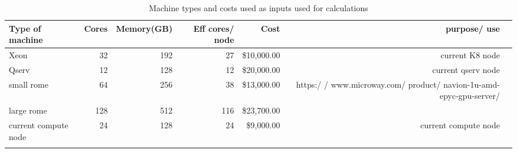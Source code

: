 \tiny \begin{longtable} { |p{}  |r  |r  |r  |r  |r  |r |} 
\caption{Machine types and costs used as inputs used for calculations \label{tab:Machines}}\\ 
\hline 
\textbf{Type of machine }&\textbf{Cores}&\textbf{Memory(GB)}&\textbf{Eff cores/ node}&\textbf{Cost}&\textbf{purpose/ use } \\ \hline
{Xeon }&{32}&{192}&{27}&{\$10,000.00}&{current K8 node } \\ \hline
{Qserv }&{12}&{128}&{12}&{\$20,000.00}&{current qserv node } \\ \hline
{small rome  }&{64}&{256}&{38}&{\$13,000.00}&{https:/ / www.microway.com/ product/ navion-1u-amd-epyc-gpu-server/ } \\ \hline
{large rome }&{128}&{512}&{116}&{\$23,700.00}& \\ \hline
{current compute node }&{24}&{128}&{24}&{\$9,000.00}&{current compute node} \\ \hline
{}&{}&{}&{}&{}&{} \\ \hline
\end{longtable} \normalsize
